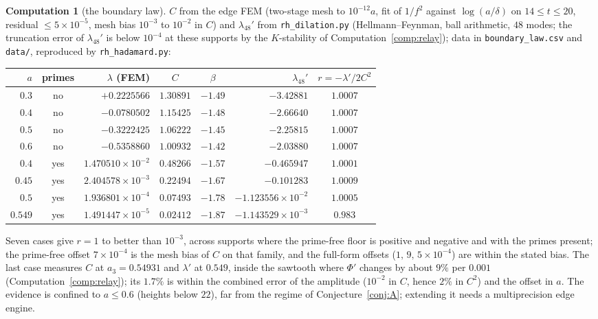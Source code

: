 \documentclass[11pt]{article}
\theoremstyle{definition}
\newtheorem{computation}[theorem]{Computation}
\theoremstyle{remark}
\begin{document}
\begin{computation}[the boundary law]\label{comp:hadamard}
$C$ from the edge FEM (two-stage mesh to $10^{-12}a$, fit of $1/f^2$ against $\log(a/\delta)$ on $14\le t\le20$, residual $\le5\times10^{-5}$, mesh bias $10^{-3}$ to $10^{-2}$ in $C$) and $\lambda_{48}'$ from \texttt{rh\_dilation.py} (Hellmann--Feynman, ball arithmetic, $48$ modes; the truncation error of $\lambda_{48}'$ is below $10^{-4}$ at these supports by the $K$-stability of Computation~\ref{comp:relay}); data in \texttt{boundary\_law.csv} and \texttt{data/}, reproduced by \texttt{rh\_hadamard.py}:
\begin{center}
\begin{tabular}{@{}rcrccrc@{}}
\toprule
$a$ & primes & $\lambda$ (FEM) & $C$ & $\beta$ & $\lambda_{48}'$ & $r=-\lambda'/2C^2$\\
\midrule
$0.3$ & no & $+0.2225566$ & $1.30891$ & $-1.49$ & $-3.42881$ & $1.0007$\\
$0.4$ & no & $-0.0780502$ & $1.15425$ & $-1.48$ & $-2.66640$ & $1.0007$\\
$0.5$ & no & $-0.3222425$ & $1.06222$ & $-1.45$ & $-2.25815$ & $1.0007$\\
$0.6$ & no & $-0.5358860$ & $1.00932$ & $-1.42$ & $-2.03880$ & $1.0007$\\
$0.4$ & yes & $1.470510\times10^{-2}$ & $0.48266$ & $-1.57$ & $-0.465947$ & $1.0001$\\
$0.45$ & yes & $2.404578\times10^{-3}$ & $0.22494$ & $-1.67$ & $-0.101283$ & $1.0009$\\
$0.5$ & yes & $1.936801\times10^{-4}$ & $0.07493$ & $-1.78$ & $-1.123556\times10^{-2}$ & $1.0005$\\
$0.549$ & yes & $1.491447\times10^{-5}$ & $0.02412$ & $-1.87$ & $-1.143529\times10^{-3}$ & $0.983$\\
\bottomrule
\end{tabular}
\end{center}
Seven cases give $r=1$ to better than $10^{-3}$, across supports where the prime-free floor is positive and negative and with the primes present; the prime-free offset $7\times10^{-4}$ is the mesh bias of $C$ on that family, and the full-form offsets ($1,\,9,\,5\times10^{-4}$) are within the stated bias. The last case measures $C$ at $a_3=0.54931$ and $\lambda'$ at $0.549$, inside the sawtooth where $\Phi'$ changes by about $9\%$ per $0.001$ (Computation~\ref{comp:relay}); its $1.7\%$ is within the combined error of the amplitude ($10^{-2}$ in $C$, hence $2\%$ in $C^2$) and the offset in $a$. The evidence is confined to $a\le0.6$ (heights below $22$), far from the regime of Conjecture~\ref{conj:A}; extending it needs a multiprecision edge engine.
\end{computation}
\end{document}
